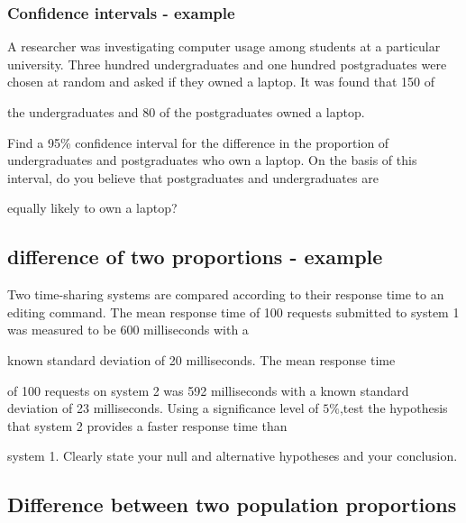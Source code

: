  

\subsubsection{Confidence intervals - example}

A researcher was investigating computer usage among students at a particular university. Three hundred undergraduates and one hundred postgraduates were chosen at random and asked if they owned a laptop. It was found that 150 of

the undergraduates and 80 of the postgraduates owned a laptop.

 

Find a 95\% confidence interval for the difference in the proportion of undergraduates and postgraduates who own a laptop. On the basis of this interval, do you believe that postgraduates and undergraduates are

equally likely to own a laptop?

 

\subsection{difference of two proportions - example}

Two time-sharing systems are compared according to their response time to an editing command. The mean response time of 100 requests submitted to system 1 was measured to be 600 milliseconds with a

known standard deviation of 20 milliseconds. The mean response time

of 100 requests on system 2 was 592 milliseconds with a known standard deviation of 23 milliseconds. Using a significance level of $5\%$,test the hypothesis that system 2 provides a faster response time than

system 1. Clearly state your null and alternative hypotheses and your conclusion.

 













\subsection{Difference between two population proportions}

